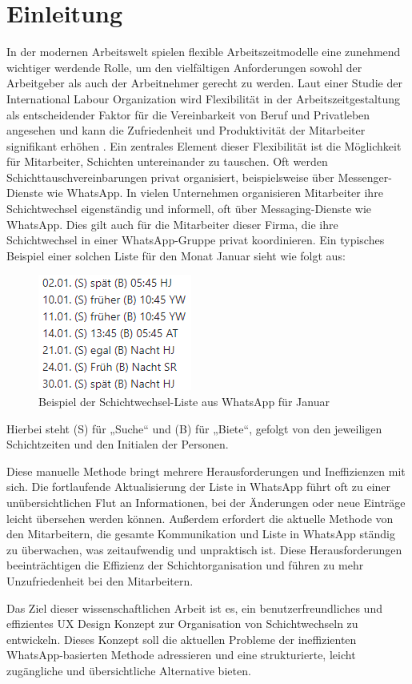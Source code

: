 \chapter{Einleitung}

In der modernen Arbeitswelt spielen flexible Arbeitszeitmodelle eine zunehmend wichtiger werdende Rolle, um den vielfältigen Anforderungen sowohl der Arbeitgeber als auch der Arbeitnehmer gerecht zu werden. 
Laut einer Studie der International Labour Organization wird Flexibilität in der Arbeitszeitgestaltung als entscheidender Faktor für die Vereinbarkeit von Beruf und Privatleben angesehen und kann die Zufriedenheit und Produktivität der Mitarbeiter signifikant erhöhen \cite[S.12 ff.]{ilo2018}. 
Ein zentrales Element dieser Flexibilität ist die Möglichkeit für Mitarbeiter, Schichten untereinander zu tauschen. 
Oft werden Schichttauschvereinbarungen privat organisiert, beispielsweise über Messenger-Dienste wie WhatsApp. 
In vielen Unternehmen organisieren Mitarbeiter ihre Schichtwechsel eigenständig und informell, oft über Messaging-Dienste wie WhatsApp. Dies gilt auch für die Mitarbeiter dieser Firma, die ihre Schichtwechsel in einer WhatsApp-Gruppe privat koordinieren. Ein typisches Beispiel einer solchen Liste für den Monat Januar sieht wie folgt aus:

\begin{figure}[h]
    \centering
    \includegraphics[clip,width=0.25\linewidth]{images/WhatsAppListe.png}
    \caption[Beispiel der Schichtwechsel-Liste aus WhatsApp für Januar]{Beispiel der Schichtwechsel-Liste aus WhatsApp für Januar}
    \label{WhatsAppListe}
\end{figure}

Hierbei steht (S) für „Suche“ und (B) für „Biete“, gefolgt von den jeweiligen Schichtzeiten und den Initialen der Personen.

Diese manuelle Methode bringt mehrere Herausforderungen und Ineffizienzen mit sich. Die fortlaufende Aktualisierung der Liste in WhatsApp führt oft zu einer unübersichtlichen Flut an Informationen, bei der Änderungen oder neue Einträge leicht übersehen werden können. 
Außerdem erfordert die aktuelle Methode von den Mitarbeitern, die gesamte Kommunikation und Liste in WhatsApp ständig zu überwachen, was zeitaufwendig und unpraktisch ist. Diese Herausforderungen beeinträchtigen die Effizienz der Schichtorganisation und führen zu mehr Unzufriedenheit bei den Mitarbeitern.

Das Ziel dieser wissenschaftlichen Arbeit ist es, ein benutzerfreundliches und effizientes UX Design Konzept zur Organisation von Schichtwechseln zu entwickeln. Dieses Konzept soll die aktuellen Probleme der ineffizienten WhatsApp-basierten Methode adressieren und eine strukturierte, leicht zugängliche und übersichtliche Alternative bieten.